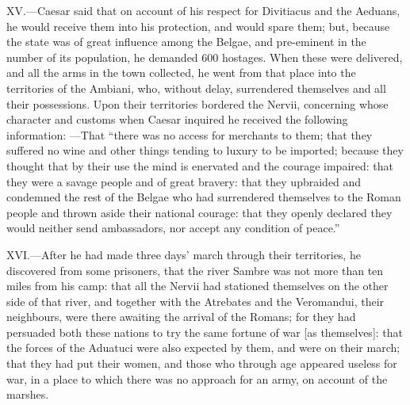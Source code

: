 XV.—Caesar said that on account of his respect for Divitiacus and the
Aeduans, he would receive them into his protection, and would spare
them; but, because the state was of great influence among the Belgae,
and pre-eminent in the number of its population, he demanded 600
hostages. When these were delivered, and all the arms in the town
collected, he went from that place into the territories of the Ambiani,
who, without delay, surrendered themselves and all their possessions.
Upon their territories bordered the Nervii, concerning whose character
and customs when Caesar inquired he received the following information:
—That ``there was no access for merchants to them; that they suffered no
wine and other things tending to luxury to be imported; because they
thought that by their use the mind is enervated and the courage
impaired: that they were a savage people and of great bravery: that they
upbraided and condemned the rest of the Belgae who had surrendered
themselves to the Roman people and thrown aside their national courage:
that they openly declared they would neither send ambassadors, nor
accept any condition of peace.''

XVI.—After he had made three days' march through their territories, he
discovered from some prisoners, that the river Sambre was not more than
ten miles from his camp: that all the Nervii had stationed themselves on
the other side of that river, and together with the Atrebates and the
Veromandui, their neighbours, were there awaiting the arrival of the
Romans; for they had persuaded both these nations to try the same
fortune of war [as themselves]: that the forces of the Aduatuci were
also expected by them, and were on their march; that they had put their
women, and those who through age appeared useless for war, in a place to
which there was no approach for an army, on account of the marshes.

